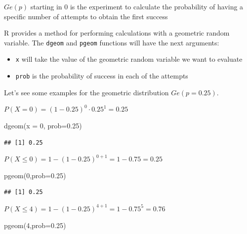 \documentclass[
]{book}
\newenvironment{Shaded}{\begin{snugshade}}{\end{snugshade}}
\newcommand{\AttributeTok}[1]{\textcolor[rgb]{0.77,0.63,0.00}{#1}}
\newcommand{\DecValTok}[1]{\textcolor[rgb]{0.00,0.00,0.81}{#1}}
\newcommand{\FloatTok}[1]{\textcolor[rgb]{0.00,0.00,0.81}{#1}}
\newcommand{\FunctionTok}[1]{\textcolor[rgb]{0.00,0.00,0.00}{#1}}
\newcommand{\NormalTok}[1]{#1}
\providecommand{\tightlist}{%
  \setlength{\itemsep}{0pt}\setlength{\parskip}{0pt}}
\theoremstyle{definition}
\theoremstyle{definition}
\theoremstyle{definition}
\theoremstyle{definition}
\theoremstyle{remark}
\begin{document}
\(Ge(p)\) starting in 0 is the experiment to calculate the probability of having a specific number of attempts to obtain the first success

R provides a method for performing calculations with a geometric random variable. The \texttt{dgeom} and \texttt{pgeom} functions will have the next arguments:

\begin{itemize}
\tightlist
\item
  \texttt{x} will take the value of the geometric random variable we want to evaluate
\item
  \texttt{prob} is the probability of success in each of the attempts
\end{itemize}

Let's see some examples for the geometric distribution \(Ge(p=0.25)\).

\(P(X=0)=(1-0.25)^0\cdot 0.25^1=0.25\)

\begin{Shaded}
\begin{Highlighting}[]
\FunctionTok{dgeom}\NormalTok{(}\AttributeTok{x =} \DecValTok{0}\NormalTok{, }\AttributeTok{prob=}\FloatTok{0.25}\NormalTok{)}
\end{Highlighting}
\end{Shaded}

\begin{verbatim}
## [1] 0.25
\end{verbatim}

\(P(X\leq 0)=1- (1-0.25)^{0+1}=1-0.75=0.25\)

\begin{Shaded}
\begin{Highlighting}[]
\FunctionTok{pgeom}\NormalTok{(}\DecValTok{0}\NormalTok{,}\AttributeTok{prob=}\FloatTok{0.25}\NormalTok{)}
\end{Highlighting}
\end{Shaded}

\begin{verbatim}
## [1] 0.25
\end{verbatim}

\(P(X\leq 4)=1-(1-0.25)^{4+1}=1-0.75^5 = 0.76\)

\begin{Shaded}
\begin{Highlighting}[]
\FunctionTok{pgeom}\NormalTok{(}\DecValTok{4}\NormalTok{,}\AttributeTok{prob=}\FloatTok{0.25}\NormalTok{)}
\end{Highlighting}
\end{Shaded}
\end{document}

